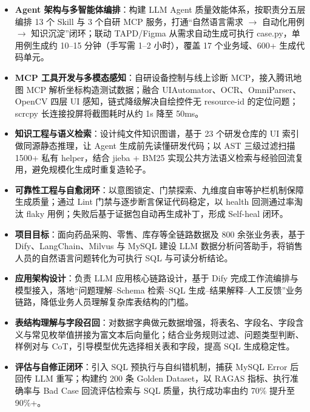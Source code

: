 \documentclass[10pt]{article}
\begin{document}
    \begin{itemize}
        \item \textbf{Agent 架构与多智能体编排}：构建 LLM Agent 质量效能体系，按职责分五层编排 13 个 Skill 与 3 个自研 MCP 服务，打通“自然语言需求 $\rightarrow$ 自动化用例 $\rightarrow$ 知识沉淀”闭环；联动 TAPD/Figma 从需求自动生成可执行 case.py，单用例生成约 10--15 分钟（手写需 1--2 小时），覆盖 17 个业务域、600+ 生成代码单元。
        \item \textbf{MCP 工具开发与多模态感知}：自研设备控制与线上诊断 MCP，接入腾讯地图 MCP 解析坐标构造测试数据；融合 UIAutomator、OCR、OmniParser、OpenCV 四层 UI 感知，链式降级解决自绘控件无 resource-id 的定位问题；scrcpy 长连接投屏将截图耗时从约 1s 降至 50ms。
        \item \textbf{知识工程与语义检索}：设计纯文件知识图谱，基于 23 个研发仓库的 UI 索引做同源静态推理，让 Agent 生成前先读懂研发代码；以 AST 三级过滤扫描 1500+ 私有 helper，结合 jieba + BM25 实现公共方法语义检索与经验回流复用，避免规模化生成时重复造轮子。
        \item \textbf{可靠性工程与自愈闭环}：以意图锁定、门禁探索、九维度自审等护栏机制保障生成质量；通过 Lint 门禁与逐步断言保证代码稳定，以 health 回测通过率淘汰 flaky 用例；失败后基于证据包自动再生成补丁，形成 Self-heal 闭环。
    \end{itemize}

    \vspace{0.35em}
    \begin{itemize}
        \item \textbf{项目目标}：面向药品采购、零售、库存等全链路数据及 800 余张业务表，基于 Dify、LangChain、Milvus 与 MySQL 建设 LLM 数据分析问答助手，将销售人员的自然语言问题转化为可执行 SQL 与可读分析结论。
        \item \textbf{应用架构设计}：负责 LLM 应用核心链路设计，基于 Dify 完成工作流编排与模型接入，落地“问题理解--Schema 检索--SQL 生成--结果解释--人工反馈”业务链路，降低业务人员理解复杂库表结构的门槛。
        \item \textbf{表结构理解与字段召回}：对数据字典做元数据增强，将表名、字段名、字段含义与常见枚举值拼接为富文本后向量化；结合业务规则过滤、问题类型判断、样例对与 CoT，引导模型优先选择相关表和字段，提高 SQL 生成稳定性。
        \item \textbf{评估与自修正闭环}：引入 SQL 预执行与自纠错机制，捕获 MySQL Error 后回传 LLM 重写；构建约 200 条 Golden Dataset，以 RAGAS 指标、执行准确率与 Bad Case 回流评估检索与 SQL 质量，执行成功率由约 70\% 提升至 90\%+。
    \end{itemize}
\end{document}

